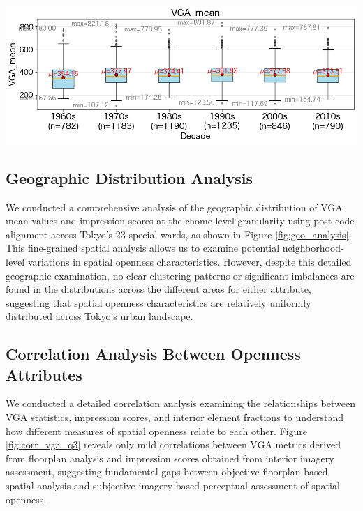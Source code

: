 \documentclass[11pt,a4paper]{article}
\begin{document}
\begin{multicols}{2}
\begin{center}
    \includegraphics[width=0.9\columnwidth]{plots/vga_10years_box.png}
    \label{fig:temporal_analysis}
\end{center}
\subsection{Geographic Distribution Analysis}

We conducted a comprehensive analysis of the geographic distribution of VGA mean values and impression scores at the chome-level granularity using post-code alignment across Tokyo's 23 special wards, as shown in Figure \ref{fig:geo_analysis}. This fine-grained spatial analysis allows us to examine potential neighborhood-level variations in spatial openness characteristics. However, despite this detailed geographic examination, no clear clustering patterns or significant imbalances are found in the distributions across the different areas for either attribute, suggesting that spatial openness characteristics are relatively uniformly distributed across Tokyo's urban landscape.

\subsection{Correlation Analysis Between Openness Attributes}
We conducted a detailed correlation analysis examining the relationships between VGA statistics, impression scores, and interior element fractions to understand how different measures of spatial openness relate to each other.
Figure \ref{fig:corr_vga_q3} reveals only mild correlations between VGA metrics derived from floorplan analysis and impression scores obtained from interior imagery assessment, suggesting fundamental gaps between objective floorplan-based spatial analysis and subjective imagery-based perceptual assessment of spatial openness.
\vspace{1em}


\end{multicols}
\end{document}
